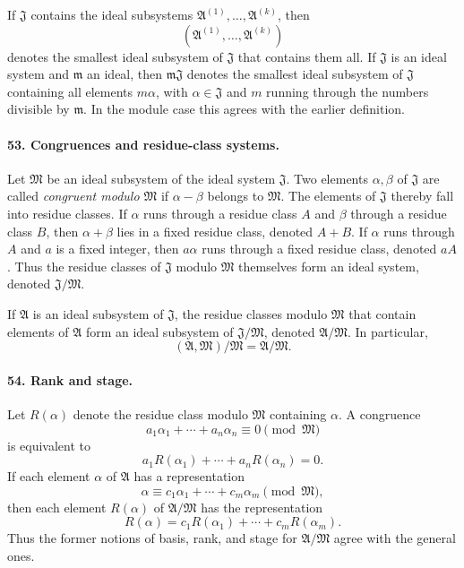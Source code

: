 \documentclass[11pt]{article}
\begin{document}
If $\mathfrak J$ contains the ideal subsystems $\mathfrak A^{(1)},\ldots,\mathfrak A^{(k)}$, then
\[
  (\mathfrak A^{(1)},\ldots,\mathfrak A^{(k)})
\]
denotes the smallest ideal subsystem of $\mathfrak J$ that contains them all. If $\mathfrak J$ is an ideal system and $\mathfrak m$ an ideal, then $\mathfrak m\mathfrak J$ denotes the smallest ideal subsystem of $\mathfrak J$ containing all elements $m\alpha$, with $\alpha\in\mathfrak J$ and $m$ running through the numbers divisible by $\mathfrak m$. In the module case this agrees with the earlier definition.

\paragraph{53. Congruences and residue-class systems.}
Let $\mathfrak M$ be an ideal subsystem of the ideal system $\mathfrak J$. Two elements $\alpha,\beta$ of $\mathfrak J$ are called \emph{congruent modulo $\mathfrak M$} if $\alpha-\beta$ belongs to $\mathfrak M$. The elements of $\mathfrak J$ thereby fall into residue classes. If $\alpha$ runs through a residue class $A$ and $\beta$ through a residue class $B$, then $\alpha+\beta$ lies in a fixed residue class, denoted $A+B$. If $\alpha$ runs through $A$ and $a$ is a fixed integer, then $a\alpha$ runs through a fixed residue class, denoted $aA$. Thus the residue classes of $\mathfrak J$ modulo $\mathfrak M$ themselves form an ideal system, denoted $\mathfrak J/\mathfrak M$.

If $\mathfrak A$ is an ideal subsystem of $\mathfrak J$, the residue classes modulo $\mathfrak M$ that contain elements of $\mathfrak A$ form an ideal subsystem of $\mathfrak J/\mathfrak M$, denoted $\mathfrak A/\mathfrak M$. In particular,
\[
  (\mathfrak A,\mathfrak M)/\mathfrak M=\mathfrak A/\mathfrak M.
\]

\paragraph{54. Rank and stage.}
Let $R(\alpha)$ denote the residue class modulo $\mathfrak M$ containing $\alpha$. A congruence
\[
  a_1\alpha_1+\cdots+a_n\alpha_n\equiv0\pmod{\mathfrak M}
\]
is equivalent to
\[
  a_1R(\alpha_1)+\cdots+a_nR(\alpha_n)=0.
\]
If each element $\alpha$ of $\mathfrak A$ has a representation
\[
  \alpha\equiv c_1\alpha_1+\cdots+c_m\alpha_m\pmod{\mathfrak M},
\]
then each element $R(\alpha)$ of $\mathfrak A/\mathfrak M$ has the representation
\[
  R(\alpha)=c_1R(\alpha_1)+\cdots+c_mR(\alpha_m).
\]
Thus the former notions of basis, rank, and stage for $\mathfrak A/\mathfrak M$ agree with the general ones.
\end{document}

